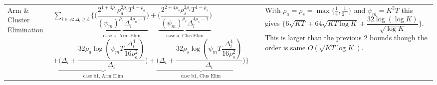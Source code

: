 \begin{remark}
\begin{table}
\begin{center}
\begin{tabular}{p{1.4cm}p{10.2cm}p{3.5cm}}
Arm \& Cluster Elimination 	&$\sum_{i\in A:\Delta_{i}\geq b} \bigg\lbrace \underbrace{\bigg(\dfrac{2^{1+4\rho_{a}}\rho_{a}^{2\rho_{a}}T^{1-\rho_{a}}}{(\psi_{m})^{\rho_{a}}\Delta_{i}^{4\rho_{a}-1}}\bigg)}_{\text{case a, Arm Elim}} + \underbrace{\bigg(\dfrac{2^{2+4\rho_{s}}\rho_{s}^{2\rho_{s}}T^{1-\rho_{s}}}{(\psi_{m})^{\rho_{s}}\Delta_{i}^{4\rho_{s}-1}}\bigg)}_{\text{case a, Clus Elim}} $   $+ \underbrace{\bigg(\Delta_{i}+\dfrac{32\rho_{a}\log{(\psi_{m}T\dfrac{\Delta_{i}^{4}}{16\rho_{a}^{2}})}}{\Delta_{i}}\bigg)}_{\text{case b1, Arm Elim}} +\underbrace{\bigg(\Delta_{i}+\dfrac{32\rho_{s}\log{(\psi_{m}T\dfrac{\Delta_{i}^{4}}{16\rho_{s}^{2}})}}{\Delta_{i}}\bigg)}_{\text{case b1, Clus Elim}}\bigg\rbrace$ & With $\rho_{a}=\rho_{s}=\max\lbrace\frac{1}{4},\frac{1}{2^{m}}\rbrace$ and $\psi_{m}=K^{2}T$ this gives $\bigg\lbrace 6\sqrt{KT} + 64\sqrt{KT\log K} + \dfrac{32\log(\log K)}{\sqrt{\log K}} \bigg\rbrace$. This is larger than the previous $2$ bounds though the order is same $O(\sqrt{KT\log K})$.
\end{tabular}
\end{center}
\end{table}


\end{remark}
